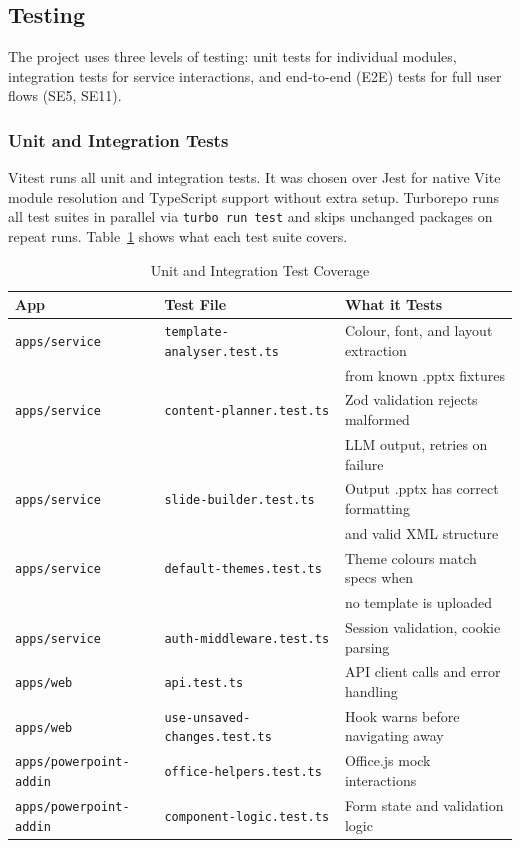 \subsection{Testing}

The project uses three levels of testing: unit tests for individual modules, integration tests for service interactions, and end-to-end (E2E) tests for full user flows (SE5, SE11).

\subsubsection{Unit and Integration Tests}

Vitest \parencite{vitest2024} runs all unit and integration tests. It was chosen over Jest for native Vite module resolution and TypeScript support without extra setup. Turborepo runs all test suites in parallel via \texttt{turbo run test} and skips unchanged packages on repeat runs. Table~\ref{tab:test-coverage} shows what each test suite covers.

\begin{table}[H]
\centering
\begin{tabular}{|l|l|l|}
\hline
\rowcolor{gray!20} \textbf{App} & \textbf{Test File} & \textbf{What it Tests} \\
\hline
\texttt{apps/service} & \texttt{template-analyser.test.ts} & Colour, font, and layout extraction \\
 & & from known .pptx fixtures \\
\hline
\texttt{apps/service} & \texttt{content-planner.test.ts} & Zod validation rejects malformed \\
 & & LLM output, retries on failure \\
\hline
\texttt{apps/service} & \texttt{slide-builder.test.ts} & Output .pptx has correct formatting \\
 & & and valid XML structure \\
\hline
\texttt{apps/service} & \texttt{default-themes.test.ts} & Theme colours match specs when \\
 & & no template is uploaded \\
\hline
\texttt{apps/service} & \texttt{auth-middleware.test.ts} & Session validation, cookie parsing \\
\hline
\texttt{apps/web} & \texttt{api.test.ts} & API client calls and error handling \\
\hline
\texttt{apps/web} & \texttt{use-unsaved-changes.test.ts} & Hook warns before navigating away \\
\hline
\texttt{apps/powerpoint-addin} & \texttt{office-helpers.test.ts} & Office.js mock interactions \\
\hline
\texttt{apps/powerpoint-addin} & \texttt{component-logic.test.ts} & Form state and validation logic \\
\hline
\end{tabular}
\caption{Unit and Integration Test Coverage}
\label{tab:test-coverage}
\end{table}

